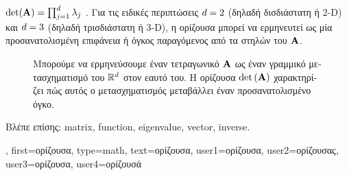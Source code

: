 {{		$\det({\bf A}) = \prod_{j=1}^{d} \lambda_{j}$ \cite{HornMatAnalysis}.
    		\foreignlanguage{greek}{Για τις ειδικές περιπτώσεις $d=2$ (δηλαδή δισδιάστατη ή 2-D) και $d=3$ 
		(δηλαδή τρισδιάστατη ή 3-D), η ορίζουσα μπορεί να ερμηνευτεί ως μία προσανατολισμένη επιφάνεια ή όγκος παραγόμενος από
		τα}  \foreignlanguage{greek}{στηλών του} ${\bf A}$.
    		\begin{figure}[H]
    			\begin{center}
			\end{center}
			{
			\caption{\foreignlanguage{greek}{Μπορούμε να ερμηνεύσουμε έναν τετραγωνικό}  ${\bf A}$ 
				\foreignlanguage{greek}{ως έναν γραμμικό μετασχηματισμό του $\mathbb{R}^{d}$ στον εαυτό του.
				Η ορίζουσα $\det\,({\bf A})$ χαρακτηρίζει πώς αυτός ο μετασχηματισμός μεταβάλλει έναν προσανατολισμένο όγκο.}
				\label{fig_det_dict}} }
		\end{figure}
		\foreignlanguage{greek}{Βλέπε επίσης:} \gls{matrix}, \gls{function}, \gls{eigenvalue}, \gls{vector}, \gls{inverse}.},
	first={\foreignlanguage{greek}{ορίζουσα}},
	type=math,
	text={\foreignlanguage{greek}{ορίζουσα}},
	user1={\foreignlanguage{greek}{ορίζουσα}}, %
	user2={\foreignlanguage{greek}{ορίζουσας}}, %
	user3={\foreignlanguage{greek}{ορίζουσα}}, %
	user4={\foreignlanguage{greek}{ορίζουσά}} %
}

